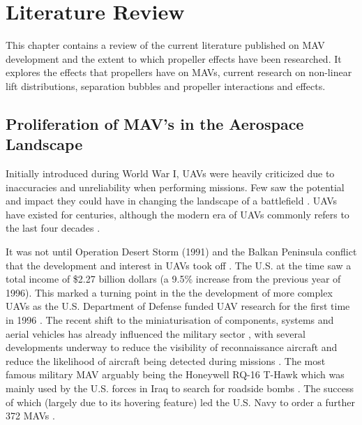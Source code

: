 \graphicspath{{./Figs/}}


\chapter{Literature Review}
This chapter contains a review of the current literature published on MAV development and the extent to which propeller effects have been researched. It explores the effects that propellers have on MAVs, current research on non-linear lift distributions, separation bubbles and propeller interactions and effects.

\section{Proliferation of MAV's in the Aerospace Landscape}
\label{subsec:ProliferationMAVs}
Initially introduced during World War I, \acrshort{UAV}s were heavily criticized due to inaccuracies and unreliability when performing missions. Few saw the potential and impact they could have in changing the landscape of a battlefield \cite{thebook}. \acrshort{UAV}s have existed for centuries, although the modern era of \acrshort{UAV}s commonly refers to the last four decades \cite{Cook2007}. 

It was not until Operation Desert Storm (1991) and the Balkan Peninsula conflict that the development and interest in \acrshort{UAV}s took off \cite{thebook, MacConnell2007}.  The U.S. at the time saw a total income of \$2.27 billion dollars \cite{thebook} (a 9.5\% increase from the previous year of 1996). This marked a turning point in the the development of more complex UAVs \cite{tac2022} as the U.S. Department of Defense funded \acrshort{UAV} research for the first time in 1996 \cite{keennon2003}. The recent shift to the miniaturisation of components, systems and aerial vehicles has already influenced the military sector \cite{Aleksander2018, Mil2022}, with several developments underway to reduce the visibility of reconnaissance aircraft and reduce the likelihood of aircraft being detected during missions \cite{Greenwood2019, Saytov2022}.  The most famous military \acrshort{MAV} arguably being the Honeywell RQ-16 T-Hawk \cite{Agbeyangi2016}  which was mainly used by the U.S. forces in Iraq to search for roadside bombs \cite{Crivoi2022}. The success of which (largely due to its hovering feature) led the U.S. Navy to order a further 372 \acrshort{MAV}s \cite{design2022}.


